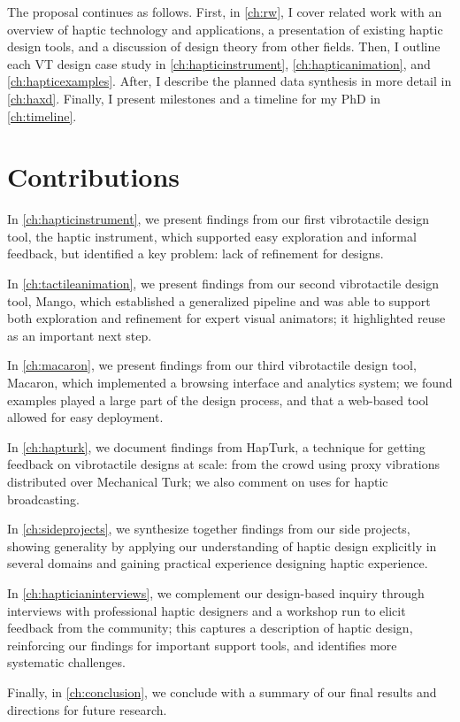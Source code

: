 The proposal continues as follows.
First, in \autoref{ch:rw}, I cover related work with an overview of haptic technology and applications, a presentation of existing haptic design tools, and a discussion of design theory from other fields.
Then, I outline each VT design case study in \autoref{ch:hapticinstrument},  \autoref{ch:hapticanimation}, and \autoref{ch:hapticexamples}.
After, I describe the planned data synthesis in more detail in \autoref{ch:haxd}.
Finally, I present milestones and a timeline for my PhD in \autoref{ch:timeline}.


\section{Contributions}

In \autoref{ch:hapticinstrument}, we present findings from our first vibrotactile design tool, the haptic instrument, which supported easy exploration and informal feedback, but identified a key problem: lack of refinement for designs.

In \autoref{ch:tactileanimation}, we present findings from our second vibrotactile design tool, Mango, which established a generalized pipeline and was able to support both exploration and refinement for expert visual animators; it highlighted reuse as an important next step.

In \autoref{ch:macaron}, we present findings from our third vibrotactile design tool, Macaron, which implemented a browsing interface and analytics system; we found examples played a large part of the design process, and that a web-based tool allowed for easy deployment.

In \autoref{ch:hapturk}, we document findings from HapTurk, a technique for getting feedback on vibrotactile designs at scale: from the crowd using proxy vibrations distributed over Mechanical Turk; we also comment on uses for haptic broadcasting.

In \autoref{ch:sideprojects}, we synthesize together findings from our side projects, showing generality by applying our understanding of haptic design explicitly in several domains and gaining practical experience designing haptic experience.

In \autoref{ch:hapticianinterviews}, we complement our design-based inquiry through interviews with professional haptic designers and a workshop run to elicit feedback from the community; this captures a description of haptic design, reinforcing our findings for important support tools, and identifies more systematic challenges.

Finally, in \autoref{ch:conclusion}, we conclude with a summary of our final results and directions for future research.


%
%
\endinput

Any text after an \endinput is ignored.
You could put scraps here or things in progress.
